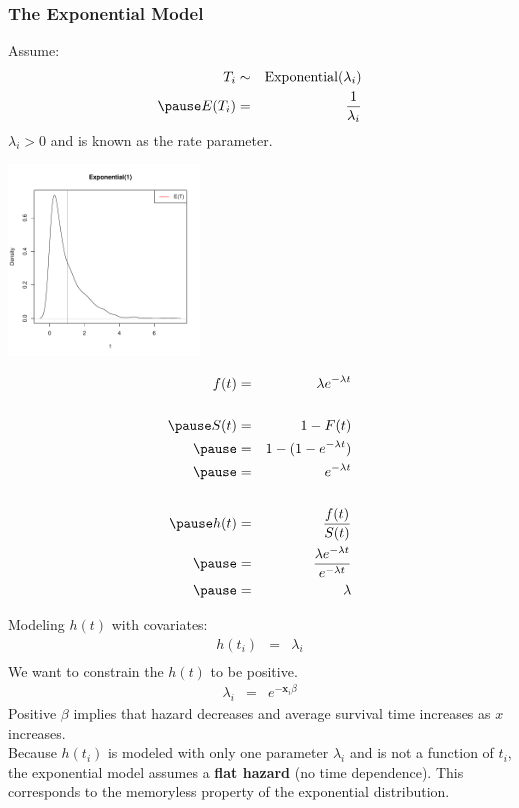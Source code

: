 \documentclass[handout]{beamer}
\begin{document}
\begin{frame}
\frametitle{The Exponential Model}
\pause
Assume:
\begin{eqnarray*}
T_i &\sim& \mathrm{Exponential}(\lambda_i)\\
\pause
E(T_i) &=& \frac{1}{\lambda_i}
\end{eqnarray*}
\pause
$\lambda_i > 0$ and is known as the rate parameter.
\begin{center}
\includegraphics[width = 2in, height = 2in]{survival_present-expo1.pdf}
\end{center}

\end{frame}

\begin{frame}
\begin{eqnarray*}
f(t) &=& \lambda e^{-\lambda t}\\\\
\pause
S(t) &=& 1 - F(t)\\
\pause
&=& 1 - (1 - e^{-\lambda t})\\
\pause
&=& e^{-\lambda t}\\\\
\pause
h(t) &=& \frac{f(t)}{S(t)}\\
\pause
&=& \frac{\lambda e^{-\lambda t}}{e^{-\lambda t}}\\
\pause
&=& \lambda
\end{eqnarray*}
\end{frame}

\begin{frame}
Modeling $h(t)$ with covariates:
\pause
\begin{eqnarray*}
h(t_i) &=& \lambda_i\\
\end{eqnarray*}
\pause
We want to constrain the $h(t)$ to be positive.
\pause
\begin{eqnarray*}
\lambda_i &=& e^{-\mathbf{x}_i \beta}
\end{eqnarray*}
\pause
Positive $\beta$ implies that hazard decreases and average survival
time increases as $x$ increases.\\
\bigskip
\pause
Because $h(t_i)$ is modeled with only one parameter $\lambda_i$ and is
not a function of $t_i$, the
exponential model assumes a \textbf{flat hazard} (no time dependence). \pause This
corresponds to the memoryless property of the exponential distribution.
\end{frame}
\end{document}
